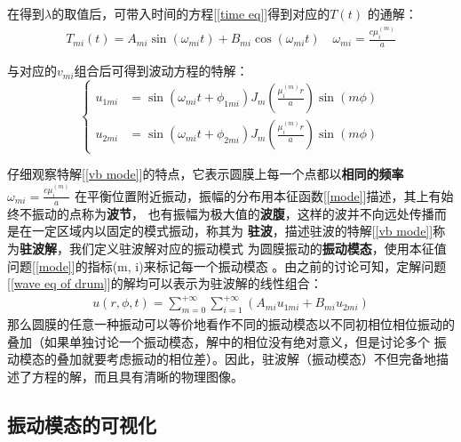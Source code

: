 \documentclass[a4paper]{ctexart}
\begin{document}
	\par 
	在得到$\lambda$的取值后，可带入时间的方程[\ref{time eq}]得到对应的$T(t)$
	的通解：
	\begin{align}
		T_{mi}(t) = A_{mi}\sin(\omega_{mi}t) + B_{mi}\cos(\omega_{mi}t)\quad \omega_{mi} = \frac{c\mu_{i}^{(m)}}{a}
	\end{align}
	\par 
	\par 与对应的$v_{mi}$组合后可得到波动方程的特解：
	\begin{equation}
		\left\{
			\begin{split}
				u_{1mi} &= \sin(\omega_{mi}t + \phi_{1mi}) 
				J_m\left(\frac{\mu_{i}^{(m)}r}{a}\right)\sin(m\phi)\\
				u_{2mi} &= \sin(\omega_{mi}t + \phi_{2mi})
				J_m\left(\frac{\mu_{i}^{(m)}r}{a}\right)\sin(m\phi)
			\end{split}
		\right.
		\label{vb mode}
	\end{equation}
	\par 
	仔细观察特解[\ref{vb mode}]的特点，它表示圆膜上每一个点都以\textbf{相同的频率}$\omega_{mi} = \frac{c\mu_{i}^{(m)}}{a}$
	在平衡位置附近振动，振幅的分布用本征函数[\ref{mode}]描述，其上有始终不振动的点称为\textbf{波节}，
	也有振幅为极大值的\textbf{波腹}，这样的波并不向远处传播而是在一定区域内以固定的模式振动，称其为
	\textbf{驻波}，描述驻波的特解[\ref{vb mode}]称为\textbf{驻波解}，我们定义驻波解对应的振动模式
	为圆膜振动的\textbf{振动模态}，使用本征值问题[\ref{mode}]的指标(m, i)来标记每一个振动模态
	。由之前的讨论可知，定解问题[\ref{wave eq of drum}]的解均可以表示为驻波解的线性组合：
	\begin{align}
		u(r, \phi, t) = \sum_{m=0}^{+\infty}\sum_{i=1}^{+\infty}(A_{mi}u_{1mi} + B_{mi}u_{2mi})
	\end{align}
	那么圆膜的任意一种振动可以等价地看作不同的振动模态以不同初相位相位振动的叠加（如果单独讨论一个振动模态，解中的相位没有绝对意义，但是讨论多个
	振动模态的叠加就要考虑振动的相位差）。因此，驻波解（振动模态）不但完备地描述了方程的解，而且具有清晰的物理图像。
	\subsection{振动模态的可视化} 
\end{document}
